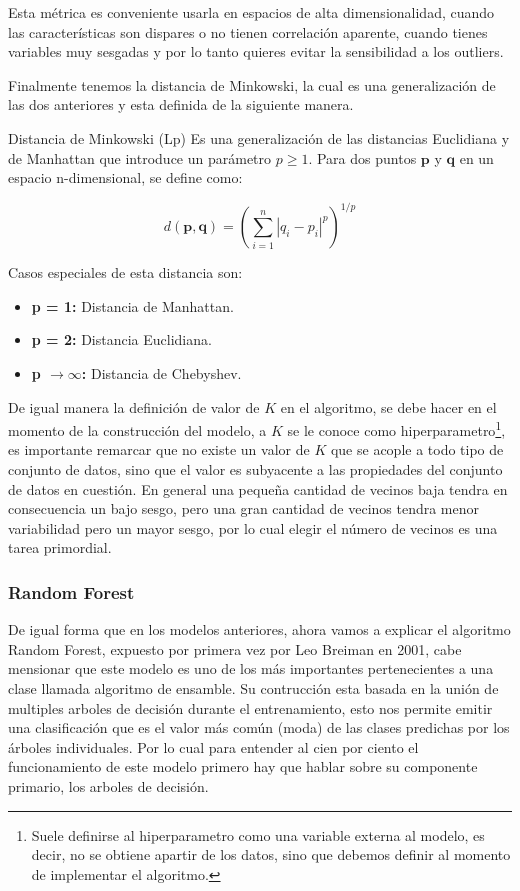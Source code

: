 Esta métrica es conveniente usarla en espacios de alta dimensionalidad, cuando las características son dispares o no tienen correlación aparente, cuando tienes variables muy sesgadas y por lo tanto quieres evitar la sensibilidad a los outliers.

Finalmente tenemos la distancia de Minkowski, la cual es una generalización de las dos anteriores y esta definida de la siguiente manera.

\begin{definicion}{Distancia de Minkowski (Lp)}
	Es una generalización de las distancias Euclidiana y de Manhattan que introduce un parámetro $p \ge 1$. Para dos puntos $\mathbf{p}$ y $\mathbf{q}$ en un espacio n-dimensional, se define como:
	
	\[
	d(\mathbf{p}, \mathbf{q}) = \left( \sum_{i=1}^{n} |q_i - p_i|^p \right)^{1/p}
	\]
	
	Casos especiales de esta distancia son:
	\begin{itemize}
		\item \textbf{p = 1:} Distancia de Manhattan.
		\item \textbf{p = 2:} Distancia Euclidiana.
		\item \textbf{p $\to \infty$:} Distancia de Chebyshev.
	\end{itemize}
\end{definicion}


De igual manera la definición de valor de $K$ en el algoritmo, se debe hacer en el momento de la construcción del modelo, a $K$ se le conoce como hiperparametro\footnote{Suele definirse al hiperparametro como una variable externa al modelo, es decir, no se obtiene apartir de los datos, sino que debemos definir al momento de implementar el algoritmo.}, es importante remarcar que no existe un valor de $K$ que se acople a todo tipo de conjunto de datos, sino que el valor es subyacente a las propiedades del conjunto de datos en cuestión. En general una pequeña cantidad de vecinos baja tendra en consecuencia un bajo sesgo, pero una gran cantidad de vecinos tendra menor variabilidad pero un mayor sesgo, por lo cual elegir el número de vecinos es una tarea primordial.

\subsubsection{Random Forest}

De igual forma que en los modelos anteriores, ahora vamos a explicar el algoritmo Random Forest, expuesto por primera vez por Leo Breiman en 2001, cabe mensionar que este modelo es uno de los más importantes pertenecientes a una clase llamada algoritmo de ensamble. Su contrucción esta basada en la unión de multiples arboles de decisión durante el entrenamiento, esto nos permite emitir una clasificación que es el valor más común (moda) de las clases predichas por los árboles individuales. Por lo cual para entender al cien por ciento el funcionamiento de este modelo primero hay que hablar sobre su componente primario, los arboles de decisión.


